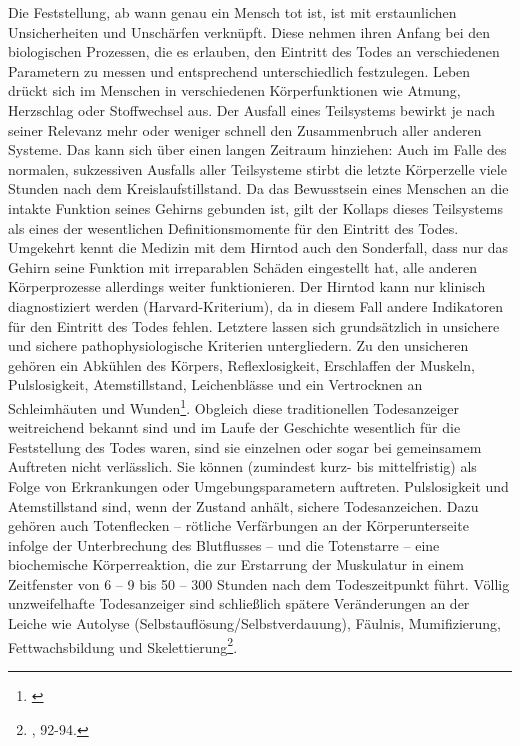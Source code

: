 \documentclass[openany,twoside,twocolumn]{book}
\let\rmarkdownfootnote\footnote%
\def\footnote{\protect\rmarkdownfootnote}
\begin{document}
Die Feststellung, ab wann genau ein Mensch tot ist, ist mit
erstaunlichen Unsicherheiten und Unschärfen verknüpft. Diese nehmen
ihren Anfang bei den biologischen Prozessen, die es erlauben, den
Eintritt des Todes an verschiedenen Parametern zu messen und
entsprechend unterschiedlich festzulegen. Leben drückt sich im Menschen
in verschiedenen Körperfunktionen wie Atmung, Herzschlag oder
Stoffwechsel aus. Der Ausfall eines Teilsystems bewirkt je nach seiner
Relevanz mehr oder weniger schnell den Zusammenbruch aller anderen
Systeme. Das kann sich über einen langen Zeitraum hinziehen: Auch im
Falle des normalen, sukzessiven Ausfalls aller Teilsysteme stirbt die
letzte Körperzelle viele Stunden nach dem Kreislaufstillstand. Da das
Bewusstsein eines Menschen an die intakte Funktion seines Gehirns
gebunden ist, gilt der Kollaps dieses Teilsystems als eines der
wesentlichen Definitionsmomente für den Eintritt des Todes. Umgekehrt
kennt die Medizin mit dem Hirntod auch den Sonderfall, dass nur das
Gehirn seine Funktion mit irreparablen Schäden eingestellt hat, alle
anderen Körperprozesse allerdings weiter funktionieren. Der Hirntod kann
nur klinisch diagnostiziert werden (Harvard-Kriterium), da in diesem
Fall andere Indikatoren für den Eintritt des Todes fehlen. Letztere
lassen sich grundsätzlich in unsichere und sichere pathophysiologische
Kriterien untergliedern. Zu den unsicheren gehören ein Abkühlen des
Körpers, Reflexlosigkeit, Erschlaffen der Muskeln, Pulslosigkeit,
Atemstillstand, Leichenblässe und ein Vertrocknen an Schleimhäuten und
Wunden\footnote{\textcite{forster_stichwort_1989}}. Obgleich diese
traditionellen Todesanzeiger weitreichend bekannt sind und im Laufe der
Geschichte wesentlich für die Feststellung des Todes waren, sind sie
einzelnen oder sogar bei gemeinsamem Auftreten nicht verlässlich. Sie
können (zumindest kurz- bis mittelfristig) als Folge von Erkrankungen
oder Umgebungsparametern auftreten. Pulslosigkeit und Atemstillstand
sind, wenn der Zustand anhält, sichere Todesanzeichen. Dazu gehören auch
Totenflecken -- rötliche Verfärbungen an der Körperunterseite infolge
der Unterbrechung des Blutflusses -- und die Totenstarre -- eine
biochemische Körperreaktion, die zur Erstarrung der Muskulatur in einem
Zeitfenster von 6 -- 9 bis 50 -- 300 Stunden nach dem Todeszeitpunkt
führt. Völlig unzweifelhafte Todesanzeiger sind schließlich spätere
Veränderungen an der Leiche wie Autolyse
(Selbstauflösung/Selbstverdauung), Fäulnis, Mumifizierung,
Fettwachsbildung und Skelettierung\footnote{\textcite{hofmann_rituelle_2008},
  92-94.}.
\end{document}
